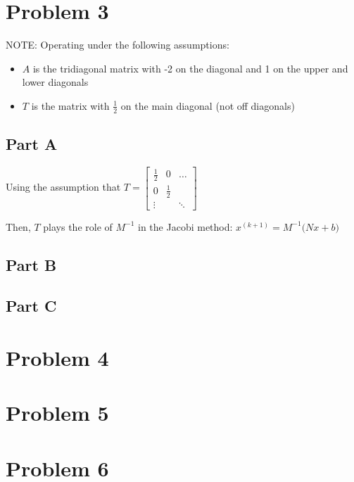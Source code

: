 \documentclass{article}
\begin{document}
\section*{Problem 3}
NOTE: Operating under the following assumptions:
\begin{itemize}
    \item $A$ is the tridiagonal matrix with -2 on the diagonal and 1 on the upper and lower diagonals
    \item $T$ is the matrix with $\frac{1}{2}$ on the main diagonal (not off diagonals)
\end{itemize}

\subsection*{Part A}
Using the assumption that \( T = \begin{bmatrix} \frac{1}{2} & 0 & \dots \\ 0 & \frac{1}{2} &  \\ \vdots &  & \ddots \end{bmatrix} \)

Then, $T$ plays the role of $M^{-1}$ in the Jacobi method: 
\( x^{(k+1)} = M^{-1}\big(Nx + b\big) \)

\subsection*{Part B}

\subsection*{Part C}


\section*{Problem 4}

\section*{Problem 5}

\section*{Problem 6}
\end{document}
